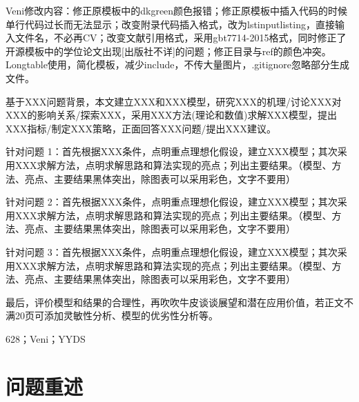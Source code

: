 \documentclass[12pt,utf8]{article}
\begin{document}

\begin{center} 
   \bfseries{}
   \vspace{2ex}
   
   \bfseries{}
\end{center}


Veni修改内容：修正原模板中的dkgreen颜色报错；修正原模板中插入代码的时候单行代码过长而无法显示；改变附录代码插入格式，改为lstinputlisting，直接输入文件名，不必再CV；改变文献引用格式，采用gbt7714-2015格式，同时修正了开源模板中的学位论文出现[出版社不详]的问题；修正目录与ref的颜色冲突。Longtable使用，简化模板，减少include，不传大量图片，.gitignore忽略部分生成文件。

基于XXX问题背景，本文建立XXX和XXX模型，研究XXX的机理/讨论XXX对XXX的影响关系/探索XXX，采用XXX方法(理论和数值)求解XXX模型，提出XXX指标/制定XXX策略，正面回答XXX问题/提出XXX建议。

针对问题 1：首先根据XXX条件，点明重点理想化假设，建立XXX模型；其次采用XXX求解方法，点明求解思路和算法实现的亮点；列出主要结果。（模型、方法、亮点、主要结果黑体突出，除图表可以采用彩色，文字不要用）

针对问题 2：首先根据XXX条件，点明重点理想化假设，建立XXX模型；其次采用XXX求解方法，点明求解思路和算法实现的亮点；列出主要结果。（模型、方法、亮点、主要结果黑体突出，除图表可以采用彩色，文字不要用）

针对问题 3：首先根据XXX条件，点明重点理想化假设，建立XXX模型；其次采用XXX求解方法，点明求解思路和算法实现的亮点；列出主要结果。（模型、方法、亮点、主要结果黑体突出，除图表可以采用彩色，文字不要用）

最后，评价模型和结果的合理性，再吹吹牛皮谈谈展望和潜在应用价值，若正文不满20页可添加灵敏性分析、模型的优劣性分析等。




\vspace{2ex}

 628；Veni；YYDS
\thispagestyle{empty}


\newpage

\begin{center}
	\tableofcontents
\end{center}
\setcounter{page}{0}
\thispagestyle{empty}
\newpage

\section{问题重述}
\end{document}
